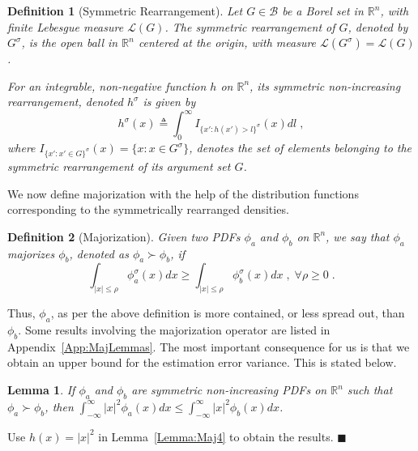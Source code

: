 \documentclass[twocolumn]{autart}
\newtheorem{lemma}[theorem]{Lemma}
\newtheorem{definition}{Definition}[section]
\newenvironment{proof}[1][Proof]{\begin{trivlist}
\item[\hskip \labelsep {\bfseries #1}]}{\end{trivlist}}
\renewcommand{\qed}{$\blacksquare$}
\begin{document}
\begin{definition} [Symmetric Rearrangement] \label{Def:SymmRearrangement}
Let $G \in \mathcal{B}$ be a Borel set in $\mathbb{R}^n$, with finite Lebesgue measure $\mathcal{L}(G)$. The \emph{symmetric rearrangement} of $G$, denoted by $G^\sigma$, is the open ball in $\mathbb{R}^n$ centered at the origin, with measure $\mathcal{L}(G^\sigma) = \mathcal{L}(G)$.

For an integrable, non-negative function $h$ on $\mathbb{R}^n$, its symmetric non-increasing rearrangement, denoted $h^\sigma$ is given by
\begin{equation} \label{Eq:SymmNDRearrangement}
h^\sigma(x) \triangleq \int_{0}^{\infty} I_{{\{ x': h(x') > l \}}^{\sigma}}(x) dl \; ,
\end{equation}
where $I_{\{x': x' \in G\}^\sigma}(x) = \{x: x \in G^\sigma \}$, denotes the set of elements belonging to the symmetric rearrangement of its argument set $G$.
\end{definition}

We now define majorization with the help of the distribution functions corresponding to the symmetrically rearranged densities.
\begin{definition} [Majorization] \label{Def:Maj}
Given two PDFs $\phi_a$ and $\phi_b$ on $\mathbb{R}^n$, we say that $\phi_a$ majorizes $\phi_b$, denoted as $\phi_a \succ \phi_b$, if
\begin{equation*}
\int_{|x| \le \rho} \phi_a^\sigma(x) d x \ge \int_{|x| \le \rho} \phi_b^\sigma(x) d x \; , \; \forall \rho \ge 0 \; .
\end{equation*}
\end{definition}
Thus, $\phi_a$, as per the above definition is more contained, or less spread out, than $\phi_b$. Some results involving the majorization operator are listed in Appendix~\ref{App:MajLemmas}. The most important consequence for us is that we obtain an upper bound for the estimation error variance. This is stated below.
\begin{lemma} \textbf{} \label{Lemma:EstErrCovOrdering}
If $\phi_a$ and $\phi_b$ are symmetric non-increasing PDFs on $\mathbb{R}^n$ such that $\phi_a \succ \phi_b$, then $\int_{-\infty}^{\infty} |x|^2 \phi_a(x) dx \le \int_{-\infty}^{\infty} |x|^2 \phi_b(x) dx$.
\end{lemma}
\begin{proof}
Use $h(x) = |x|^2$ in Lemma~\ref{Lemma:Maj4} to obtain the results. \hfill \qed
\end{proof}
\end{document}
